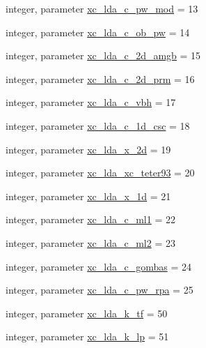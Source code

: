 \begin{DoxyCompactItemize}
\item 
integer, parameter \hyperlink{classlibxc__funcs__m_a27b05939d77a777fad458dfd11b36113}{xc\-\_\-lda\-\_\-c\-\_\-pw\-\_\-mod} = 13
\item 
integer, parameter \hyperlink{classlibxc__funcs__m_a23ba2d11f7919c8438b43844d99cdf8c}{xc\-\_\-lda\-\_\-c\-\_\-ob\-\_\-pw} = 14
\item 
integer, parameter \hyperlink{classlibxc__funcs__m_a48adc34580788ace464a6380f36e2876}{xc\-\_\-lda\-\_\-c\-\_\-2d\-\_\-amgb} = 15
\item 
integer, parameter \hyperlink{classlibxc__funcs__m_a593e255bea3463920a8a450d2f81076a}{xc\-\_\-lda\-\_\-c\-\_\-2d\-\_\-prm} = 16
\item 
integer, parameter \hyperlink{classlibxc__funcs__m_a4f5ff5491fc94eae7db87f74defdaca1}{xc\-\_\-lda\-\_\-c\-\_\-vbh} = 17
\item 
integer, parameter \hyperlink{classlibxc__funcs__m_ac253e07010d2eb729a0c1870073026d8}{xc\-\_\-lda\-\_\-c\-\_\-1d\-\_\-csc} = 18
\item 
integer, parameter \hyperlink{classlibxc__funcs__m_a90f53b87f1e8a164ae31aca6d911b55f}{xc\-\_\-lda\-\_\-x\-\_\-2d} = 19
\item 
integer, parameter \hyperlink{classlibxc__funcs__m_a8285539a61e6bea268a334c61418f2b5}{xc\-\_\-lda\-\_\-xc\-\_\-teter93} = 20
\item 
integer, parameter \hyperlink{classlibxc__funcs__m_ad51638440299463c0035f760fec3bbae}{xc\-\_\-lda\-\_\-x\-\_\-1d} = 21
\item 
integer, parameter \hyperlink{classlibxc__funcs__m_aec5aadeaa25b1c1f4720b3e79168247b}{xc\-\_\-lda\-\_\-c\-\_\-ml1} = 22
\item 
integer, parameter \hyperlink{classlibxc__funcs__m_ab73ae35d5e783e3747a1ec8777ca472d}{xc\-\_\-lda\-\_\-c\-\_\-ml2} = 23
\item 
integer, parameter \hyperlink{classlibxc__funcs__m_aae93d5c5fa3963275e8912db98db1c8b}{xc\-\_\-lda\-\_\-c\-\_\-gombas} = 24
\item 
integer, parameter \hyperlink{classlibxc__funcs__m_a130c71659257d0c8acebfcb97f305eaa}{xc\-\_\-lda\-\_\-c\-\_\-pw\-\_\-rpa} = 25
\item 
integer, parameter \hyperlink{classlibxc__funcs__m_a40bf9de96a2d9257c4741e0395c80431}{xc\-\_\-lda\-\_\-k\-\_\-tf} = 50
\item 
integer, parameter \hyperlink{classlibxc__funcs__m_a1be6335469319c3a1912e47e6ef7df45}{xc\-\_\-lda\-\_\-k\-\_\-lp} = 51
\item 

\end{DoxyCompactItemize}
